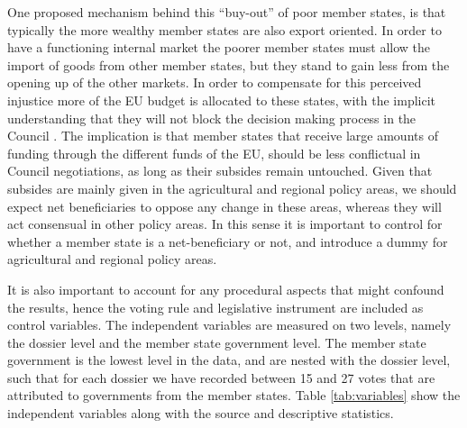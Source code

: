 One proposed mechanism behind this ``buy-out'' of poor member states, is that typically the more wealthy member states are also export oriented. In order to have a functioning internal market the poorer member states must allow the import of goods from other member states, but they stand to gain less from the opening up of the other markets. In order to compensate for this perceived injustice more of the EU budget is allocated to these states, with the implicit understanding that they will not block the decision making process in the Council \citep{Hix2005}. The implication is that member states that receive large amounts of funding through the different funds of the EU, should be less conflictual in Council negotiations, as long as their subsides remain untouched. Given that subsides are mainly given in the agricultural and regional policy areas, we should expect net beneficiaries to oppose any change in these areas, whereas they will act consensual in other policy areas. In this sense it is important to control for whether a member state is a net-beneficiary or not, and introduce a dummy for agricultural and regional policy areas. 

It is also important to account for any procedural aspects that might confound the results, hence the voting rule and legislative instrument are included as control variables. The independent variables are measured on two levels, namely the dossier level and the member state government level. The member state government is the lowest level in the data, and are nested with the dossier level, such that for each dossier we have recorded between 15 and 27 votes that are attributed to governments from the member states. Table \ref{tab:variables} show the independent variables along with the source and descriptive statistics. 

